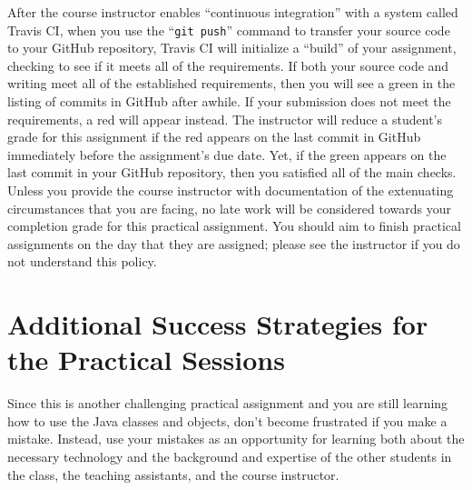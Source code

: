 \documentclass[11pt]{article}
\newcommand{\gitpush}{\command{git push}}
\newcommand{\command}[1]{``\lstinline{#1}''}
\newcommand{\step}[1]{``{#1}''}
\newcommand{\checkmark}{\ding{51}}
\newcommand{\naughtmark}{\ding{55}}
\begin{document}
After the course instructor enables \step{continuous integration} with a system
called Travis CI, when you use the \gitpush{} command to transfer your source
code to your GitHub repository, Travis CI will initialize a \step{build} of your
assignment, checking to see if it meets all of the requirements. If both your
source code and writing meet all of the established requirements, then you will
see a green \checkmark{} in the listing of commits in GitHub after awhile. If
your submission does not meet the requirements, a red \naughtmark{} will appear
instead. The instructor will reduce a student's grade for this assignment if the
red \naughtmark{} appears on the last commit in GitHub immediately before the
assignment's due date. Yet, if the green \checkmark{} appears on the last commit
in your GitHub repository, then you satisfied all of the main checks. Unless you
provide the course instructor with documentation of the extenuating
circumstances that you are facing, no late work will be considered towards your
completion grade for this practical assignment. You should aim to finish
practical assignments on the day that they are assigned; please see the
instructor if you do not understand this policy.

\section*{Additional Success Strategies for the Practical Sessions}

Since this is another challenging practical assignment and you are still
learning how to use the Java classes and objects, don't become frustrated if you
make a mistake. Instead, use your mistakes as an opportunity for learning both
about the necessary technology and the background and expertise of the other
students in the class, the teaching assistants, and the course instructor.
\end{document}

